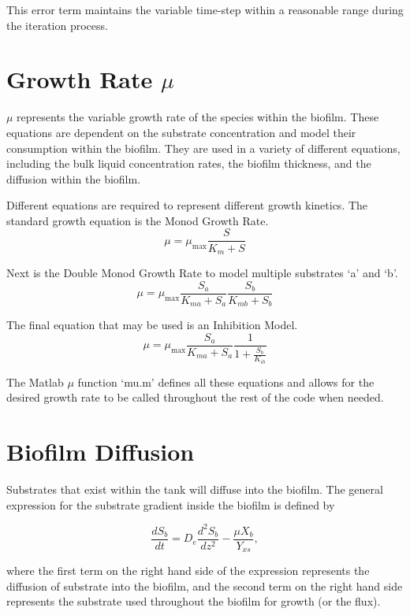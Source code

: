 \documentclass[letterpaper, twoside]{article}
\numberwithin{equation}{section}
\begin{document}
This error term maintains the variable time-step within a reasonable range during the iteration process.

\section{Growth Rate $\mu$}\label{sec:mu}
$\mu$ represents the variable growth rate of the species within the biofilm. These equations are dependent on the substrate concentration and model their consumption within the biofilm. They are used in a variety of different equations, including the bulk liquid concentration rates, the biofilm thickness, and the diffusion within the biofilm.

Different equations are required to represent different growth kinetics. The standard growth equation is the Monod Growth Rate.
\begin{equation} \label{eq: MonodGrowthRate}
  \mu=\mu_\mathrm{max} \frac{S}{K_m + S}
\end{equation}

Next is the Double Monod Growth Rate to model multiple substrates `a' and `b'.
\begin{equation} \label{eq: DoubleMonodGrowthRate}
  \mu=\mu_\mathrm{max} \frac{S_a}{K_{ma} + S_a} \frac{S_b}{K_{mb} + S_b}
\end{equation}

The final equation that may be used is an Inhibition Model.
\begin{equation} \label{eq: Inhibition}
  \mu=\mu_\mathrm{max} \frac{S_a}{K_{ma} + S_a} \frac{1}{1 + \frac{S_b}{K_{ib}}}
\end{equation}

The Matlab $\mu$ function `mu.m' defines all these equations and allows for the desired growth rate to be called throughout the rest of the code when needed.
  

\section{Biofilm Diffusion}
Substrates that exist within the tank will diffuse into the biofilm. The general expression for the substrate gradient inside the biofilm is defined by

\begin{equation} \label{eq:substrate gradient}
\frac{dS_b}{dt} = {D_e}\frac{d^2S_b}{dz^2} - \frac{\mu X_b}{Y_{xs}},
\end{equation}

where the first term on the right hand side of the expression represents the diffusion of substrate into the biofilm, and the second term on the right hand side represents the substrate used throughout the biofilm for growth (or the flux).
\end{document}
